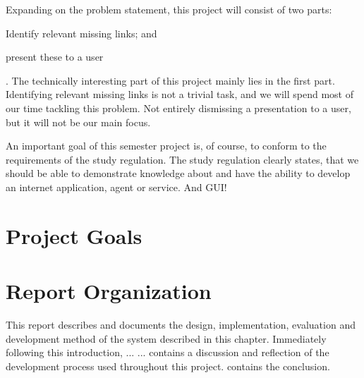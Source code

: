 Expanding on the problem statement, this project will consist of two parts:
\begin{enumerate*}[label=(\roman*)]
  \item Identify relevant missing links; and
  \item present these to a user
\end{enumerate*}.
The technically interesting part of this project mainly lies in the first part. Identifying relevant missing links is not a trivial task, and we will spend most of our time tackling this problem. Not entirely dismissing a presentation to a user, but it will not be our main focus.

An important goal of this semester project is, of course, to conform to the requirements of the study regulation. The study regulation clearly states, that we should be able to demonstrate knowledge about and have the ability to develop an internet application, agent or service. And GUI! 


\section{Project Goals}

\section{Report Organization}
This report describes and documents the design, implementation, evaluation and development method of the system described in this chapter. Immediately following this introduction,  ... \dummy ...  contains a discussion and reflection of the development process used throughout this project.  contains the conclusion.
